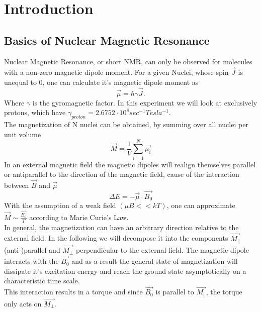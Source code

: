 \section{Introduction}\label{intro}
\subsection{Basics of Nuclear Magnetic Resonance}\label{basics}
Nuclear Magnetic Resonance, or short NMR, can only be observed for molecules with a non-zero magnetic dipole moment. For a given Nuclei, whose spin $\vec{J}$ is unequal to 0, one can calculate it's magnetic dipole moment as
\begin{equation}
	\label{1}
	\vec{\mu} = \hbar \gamma \vec{J}.
\end{equation}
Where $\gamma$ is the gyromagnetic factor. In this experiment we will look at exclusively protons, which have $\gamma_{proton} = 2.6752 \cdot 10^8 sec^{-1} Tesla^{-1}$.
\vspace{3mm} \\
The magnetization of N nuclei can be obtained, by summing over all nuclei per unit volume
\begin{equation}
	\label{2}
	\vec{M} = \dfrac{1}{V} \sum^{N}_{i=1} \vec{\mu_i}
\end{equation}
In an external magnetic field the magnetic dipoles will realign themselves parallel or antiparallel to the direction of the magnetic field, cause of the interaction between $\vec{B}$ and $\vec{\mu}$
\begin{equation}
	\label{5}
	\Delta E = - \vec{\mu} \cdot \vec{B_0}
\end{equation}
With the assumption of a weak field $(\mu B << kT)$, one can approximate $\vec{M} \sim \frac{\vec{B_{0}}}{T}$ according to Marie Curie's Law. 
\vspace{5mm} \\
In general, the magnetization can have an arbitrary direction relative to the external field. In the following we will decompose it into the components $\vec{M_{\parallel}}$ (anti-)parallel and $\vec{M_{\perp}}$ perpendicular to the external field. 
The magnetic dipole interacts with the $\vec{B_{0}}$ and as a result the general state of magnetization will dissipate it's excitation energy and reach the ground state asymptotically on a characteristic time scale.
\vspace{3mm} \\
This interaction results in a torque and since $\vec{B_{0}}$ is parallel to $\vec{M_{\parallel}}$, the torque only acts on $\vec{M_{\perp}}$.
